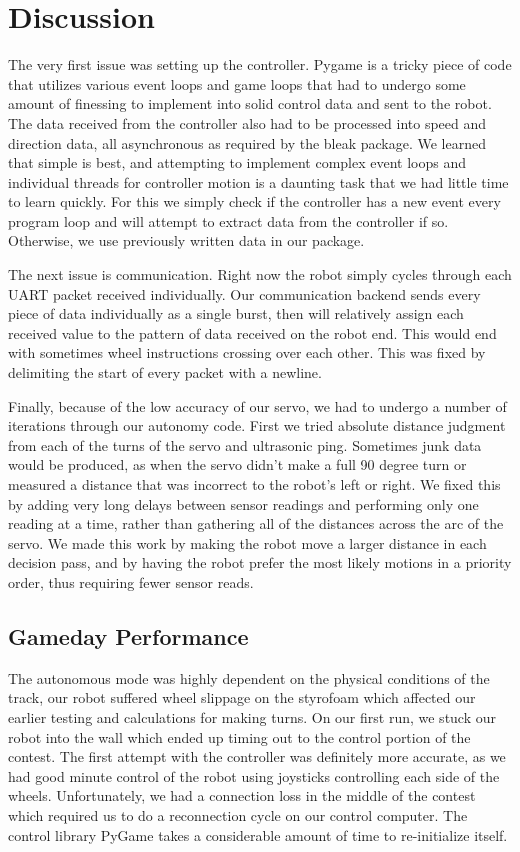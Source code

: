 \documentclass[letterpaper,11pt]{texMemo} %
\begin{document}
\section*{Discussion}
The very first issue was setting up the controller. Pygame is a tricky piece of code 
that utilizes various event loops and game loops that had to undergo some amount 
of finessing to implement into solid control data and sent to the robot. The data 
received from the controller also had to be processed into speed and direction data, 
all asynchronous as required by the bleak package. We learned that simple is best, 
and attempting to implement complex event loops and individual threads for controller 
motion is a daunting task that we had little time to learn quickly. For this we 
simply check if the controller has a new event every program loop and will attempt 
to extract data from the controller if so. Otherwise, we use previously written data 
in our package.

The next issue is communication. Right now the robot simply cycles through each UART
packet received individually. Our communication backend sends every piece of data 
individually as a single burst, then will relatively assign each received value to 
the pattern of data received on the robot end. This would end with sometimes 
wheel instructions crossing over each other. This was fixed by delimiting the start of every packet with a newline.

Finally, because of the low accuracy of our servo, we had to undergo a number of iterations 
through our autonomy code. First we tried absolute distance judgment from each of the turns 
of the servo and ultrasonic ping. Sometimes junk data would be produced, as when the servo 
didn't make a full 90 degree turn or measured a distance that was incorrect 
to the robot's left or right. We fixed this by adding very long delays between sensor readings and performing only one reading at a time, rather than gathering all of the distances across the arc of the servo. We made this work by making the robot move a larger distance in each decision pass, and by having the robot prefer the most likely motions in a priority order, thus requiring fewer sensor reads.

\subsection*{Gameday Performance}
The autonomous mode was highly dependent on the physical conditions of the track, our robot suffered 
wheel slippage on the styrofoam which affected our earlier testing and calculations for making turns. 
On our first run, we stuck our robot into the wall which ended up timing out to the control portion 
of the contest. The first attempt with the controller was definitely more accurate, as we had good 
minute control of the robot using joysticks controlling each side of the wheels. Unfortunately, 
we had a connection loss in the middle of the contest which required us to do a reconnection cycle 
on our control computer. The control library PyGame takes a considerable amount of time to re-initialize
itself.
\end{document}

